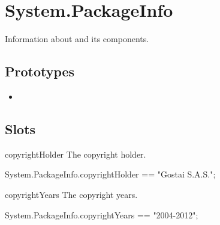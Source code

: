
\section{System.PackageInfo}
Information about \usdk and its components.

\subsection{Prototypes}
\begin{itemize}
\item {}
\end{itemize}

\subsection{Slots}
\begin{urbiscriptapi}
\item[copyrightHolder] The \usdk copyright holder.
\begin{urbiassert}
System.PackageInfo.copyrightHolder == "Gostai S.A.S.";
\end{urbiassert}

\item[copyrightYears] The \usdk copyright years.
\begin{urbiassert}
System.PackageInfo.copyrightYears == "2004-2012";
\end{urbiassert}
\end{urbiscriptapi}

